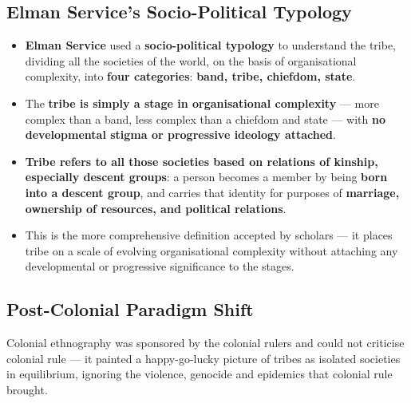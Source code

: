 \subsection{Elman Service's Socio-Political Typology}

\begin{KeyConcept}
\begin{itemize}
\item \textbf{Elman Service} used a \textbf{socio-political typology} to understand the tribe, dividing all the societies of the world, on the basis of organisational complexity, into \textbf{four categories}: \textbf{band, tribe, chiefdom, state}.
\item The \textbf{tribe is simply a stage in organisational complexity} --- more complex than a band, less complex than a chiefdom and state --- with \textbf{no developmental stigma or progressive ideology attached}.
\item \textbf{Tribe refers to all those societies based on relations of kinship, especially descent groups}: a person becomes a member by being \textbf{born into a descent group}, and carries that identity for purposes of \textbf{marriage, ownership of resources, and political relations}.
\item This is the more comprehensive definition accepted by scholars --- it places tribe on a scale of evolving organisational complexity without attaching any developmental or progressive significance to the stages.
\end{itemize}
\end{KeyConcept}

\subsection{Post-Colonial Paradigm Shift}

Colonial ethnography was sponsored by the colonial rulers and could not criticise colonial rule --- it painted a happy-go-lucky picture of tribes as isolated societies in equilibrium, ignoring the violence, genocide and epidemics that colonial rule brought.


